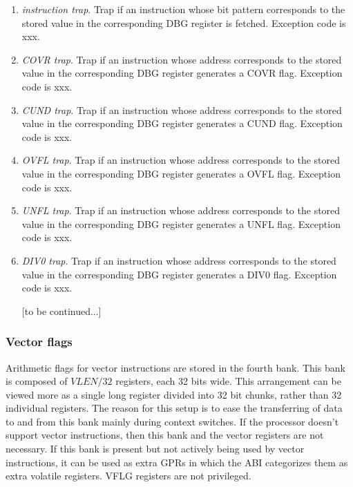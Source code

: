 \documentclass{article}
\begin{document}
\begin{enumerate}
                    \item \textit{instruction trap}. Trap if an instruction whose bit pattern corresponds to the stored value in the corresponding DBG register is fetched. Exception code is xxx.

                    \item \textit{COVR trap}. Trap if an instruction whose address corresponds to the stored value in the corresponding DBG register generates a COVR flag. Exception code is xxx.

                    \item \textit{CUND trap}. Trap if an instruction whose address corresponds to the stored value in the corresponding DBG register generates a CUND flag. Exception code is xxx.

                    \item \textit{OVFL trap}. Trap if an instruction whose address corresponds to the stored value in the corresponding DBG register generates a OVFL flag. Exception code is xxx.

                    \item \textit{UNFL trap}. Trap if an instruction whose address corresponds to the stored value in the corresponding DBG register generates a UNFL flag. Exception code is xxx.

                    \item \textit{DIV0 trap}. Trap if an instruction whose address corresponds to the stored value in the corresponding DBG register generates a DIV0 flag. Exception code is xxx.

                    [to be continued...]

                \end{enumerate}

            \subsubsection{Vector flags}

                Arithmetic flags for vector instructions are stored in the fourth bank. This bank is composed of \(VLEN/32\) registers, each 32 bits wide. This arrangement can be viewed more as a single long register divided into 32 bit chunks, rather than 32 individual registers. The reason for this setup is to ease the transferring of data to and from this bank mainly during context switches. If the processor doesn't support vector instructions, then this bank and the vector registers are not necessary. If this bank is present but not actively being used by vector instructions, it can be used as extra GPRs in which the ABI categorizes them as extra volatile registers. VFLG registers are not privileged.
\end{document}
